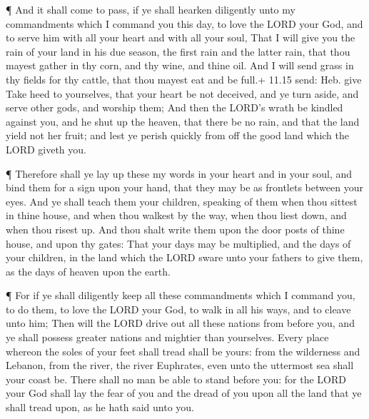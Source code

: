  ¶ And it shall come to pass, if ye shall hearken
diligently unto my commandments which I command you this day, to love
the LORD your God, and to serve him with all your heart and with all
your soul,  That I will give you the rain of your land in
his due season, the first rain and the latter rain, that thou mayest
gather in thy corn, and thy wine, and thine oil.  And I
will send grass in thy fields for thy cattle, that thou mayest eat and
be full.+ 11.15 send: Heb. give  Take heed to yourselves,
that your heart be not deceived, and ye turn aside, and serve other
gods, and worship them;  And then the LORD's wrath be
kindled against you, and he shut up the heaven, that there be no rain,
and that the land yield not her fruit; and lest ye perish quickly from
off the good land which the LORD giveth you.

 ¶ Therefore shall ye lay up these my words in your heart
and in your soul, and bind them for a sign upon your hand, that they may
be as frontlets between your eyes.  And ye shall teach them
your children, speaking of them when thou sittest in thine house, and
when thou walkest by the way, when thou liest down, and when thou risest
up.  And thou shalt write them upon the door posts of thine
house, and upon thy gates:  That your days may be
multiplied, and the days of your children, in the land which the LORD
sware unto your fathers to give them, as the days of heaven upon the
earth.

 ¶ For if ye shall diligently keep all these commandments
which I command you, to do them, to love the LORD your God, to walk in
all his ways, and to cleave unto him;  Then will the LORD
drive out all these nations from before you, and ye shall possess
greater nations and mightier than yourselves.  Every place
whereon the soles of your feet shall tread shall be yours: from the
wilderness and Lebanon, from the river, the river Euphrates, even unto
the uttermost sea shall your coast be.  There shall no man
be able to stand before you: for the LORD your God shall lay the fear of
you and the dread of you upon all the land that ye shall tread upon, as
he hath said unto you.


